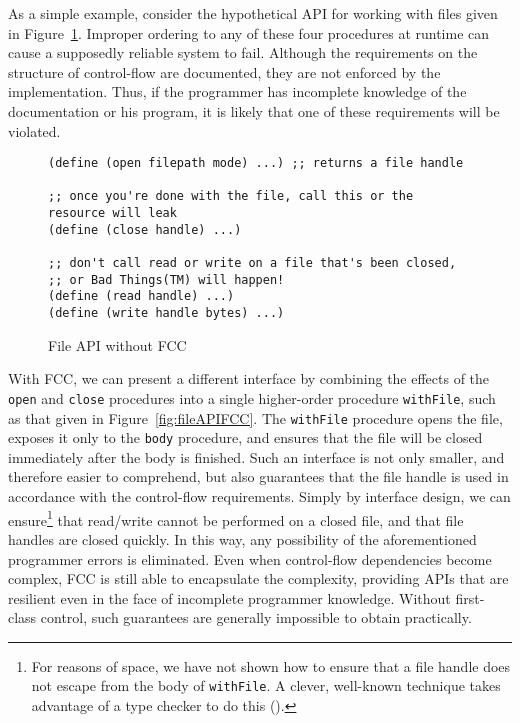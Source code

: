 \documentclass[11pt]{article}
\begin{document}
As a simple example, consider the hypothetical API for working with files given in Figure~\ref{fig:fileAPInoFCC}.
Improper ordering to any of these four procedures at runtime can cause a supposedly reliable system to fail.
Although the requirements on the structure of control-flow are documented, they are not enforced by the implementation.
Thus, if the programmer has incomplete knowledge of the documentation or his program, it is likely that one of these requirements will be violated.

\begin{figure}[H]
\caption{File API without FCC}
\label{fig:fileAPInoFCC}
\begin{verbatim}
(define (open filepath mode) ...) ;; returns a file handle

;; once you're done with the file, call this or the resource will leak
(define (close handle) ...)

;; don't call read or write on a file that's been closed,
;; or Bad Things(TM) will happen!
(define (read handle) ...)
(define (write handle bytes) ...)
\end{verbatim}
\end{figure}

With FCC, we can present a different interface by combining the effects of the \texttt{open} and \texttt{close} procedures into a single higher-order procedure \texttt{withFile}, such as that given in Figure~\ref{fig:fileAPIFCC}.
The \texttt{withFile} procedure opens the file, exposes it only to the \texttt{body} procedure, and ensures that the file will be closed immediately after the body is finished.
Such an interface is not only smaller, and therefore easier to comprehend, but also guarantees that the file handle is used in accordance with the control-flow requirements.
Simply by interface design, we can ensure\footnote{For reasons of space, we have not shown how to ensure that a file handle does not escape from the body of \texttt{withFile}. A clever, well-known technique takes advantage of a type checker to do this (\cite{StateInHaskell}).} that read/write cannot be performed on a closed file, and that file handles are closed quickly.
In this way, any possibility of the aforementioned programmer errors is eliminated.
Even when control-flow dependencies become complex, FCC is still able to encapsulate the complexity, providing APIs that are resilient even in the face of incomplete programmer knowledge.
Without first-class control, such guarantees are generally impossible to obtain practically.
\end{document}
